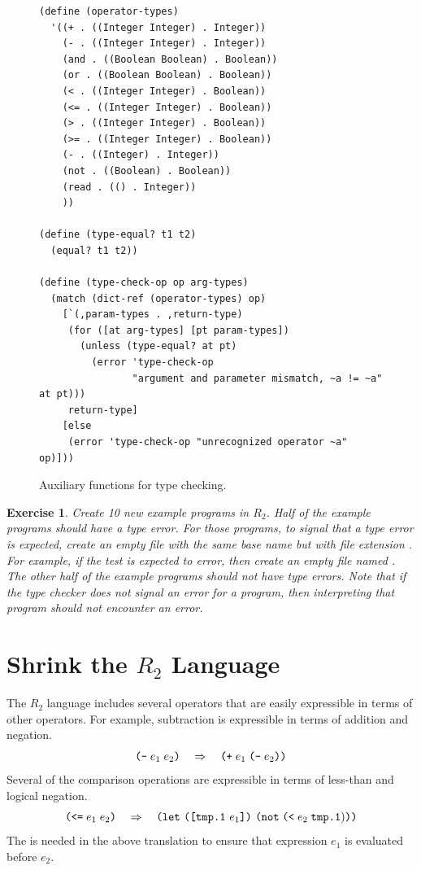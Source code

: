 \documentclass[11pt]{book}
\newtheorem{exercise}[theorem]{Exercise}
\begin{document}
\begin{figure}[tbp]
\begin{lstlisting}
(define (operator-types)
  '((+ . ((Integer Integer) . Integer))
    (- . ((Integer Integer) . Integer))
    (and . ((Boolean Boolean) . Boolean))
    (or . ((Boolean Boolean) . Boolean))
    (< . ((Integer Integer) . Boolean))
    (<= . ((Integer Integer) . Boolean))
    (> . ((Integer Integer) . Boolean))
    (>= . ((Integer Integer) . Boolean))
    (- . ((Integer) . Integer))
    (not . ((Boolean) . Boolean))
    (read . (() . Integer))
    ))

(define (type-equal? t1 t2)
  (equal? t1 t2))

(define (type-check-op op arg-types)
  (match (dict-ref (operator-types) op)
    [`(,param-types . ,return-type)
     (for ([at arg-types] [pt param-types]) 
       (unless (type-equal? at pt)
         (error 'type-check-op
                "argument and parameter mismatch, ~a != ~a" at pt)))
     return-type]
    [else
     (error 'type-check-op "unrecognized operator ~a" op)]))
\end{lstlisting}
\caption{Auxiliary functions for type checking.}
\label{fig:type-check-aux-R2}
\end{figure}



\begin{exercise}\normalfont
Create 10 new example programs in $R_2$. Half of the example programs
should have a type error. For those programs, to signal that a type
error is expected, create an empty file with the same base name but
with file extension . For example, if the test
 is expected to error, then create an empty file
named .  The other half of the example programs
should not have type errors. Note that if the type checker does not
signal an error for a program, then interpreting that program should
not encounter an error.
\end{exercise}


\section{Shrink the $R_2$ Language}
\label{sec:shrink-r2}

The $R_2$ language includes several operators that are easily
expressible in terms of other operators. For example, subtraction is
expressible in terms of addition and negation.
\[
 \texttt{(-}\; e_1 \; e_2\texttt{)} \quad \Rightarrow \quad \texttt{(}\texttt{+} \; e_1 \; \texttt{(}\texttt{-} \; e_2\texttt{)}\texttt{)}
\]
Several of the comparison operations are expressible in terms of
less-than and logical negation.
\[
\texttt{(}\texttt{<=}\; e_1 \; e_2\texttt{)} \quad \Rightarrow \quad
\texttt{(}\texttt{let}~\texttt{(}\texttt{[}\texttt{tmp.1}~e_1\texttt{]}\texttt{)}~\texttt{(}\texttt{not}\;\texttt{(}\texttt{<}\;e_2\;\texttt{tmp.1})\texttt{)}\texttt{)}
\]
The  is needed in the above translation to ensure that
expression $e_1$ is evaluated before $e_2$.
\end{document}
